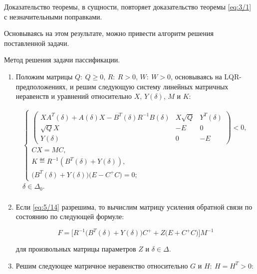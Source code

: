 Доказательство теоремы, в сущности, повторяет доказательство теоремы \vref{eq:3/1} с незначительными поправками.\br

Основываясь на этом результате, можно привести алгоритм решения поставленной задачи.

\pagebreak
\begin{alg}
\label{alg:5/1}
Метод решения задачи пассификации.

\begin{enumerate}
\item Положим матрицы $Q\colon~Q \geqslant 0$, $R\colon~R>0$, $W\colon~W>0$, основываясь на LQR-предположениях, и решим следующую систему линейных матричных неравенств и уравнений относительно $X$, $Y(\delta)$, $M$ и $K$:

\begin{eqnarray}
\label{eq:5/14}
\left\{ \begin{array}{l}
    \left( \begin{array}{ccc}
        XA^T(\delta) + A(\delta)X - B^T(\delta)R^{-1}B(\delta)   &   X\sqrt{Q}   &   Y^T(\delta) \\
        \sqrt{Q}X    &    -E    &    0 \\
        Y(\delta)    &    0     &   -E
    \end{array} \right) < 0\mbox{,} \\
    CX = MC\mbox{,} \\
    K \eqdef R^{-1}(B^T(\delta) + Y(\delta))\mbox{,} \nonumber \\
    \big( B^T(\delta) + Y(\delta) \big)\big( E - C^+C \big) = 0\mbox{;}
\end{array} \right. \\
\delta \in \Delta_0\mbox{.} \nonumber \\
\end{eqnarray}

\item Если \vref{eq:5/14} разрешима, то вычислим матрицу усиления обратной связи по состоянию по следующей формуле:

\begin{equation}
\label{eq:5/15}
F = \big[ R^{-1}\big( B^T(\delta) + Y(\delta) \big)C^+ + Z\big(E + C^+C  \big) \big]M^{-1}
\end{equation}

для произвольных матрицы параметров $Z$ и $\delta \in \Delta$.

\item Решим следующее матричное неравенство относительно $G$ и $H\colon~H=H^T>0$:


\end{enumerate}
\end{alg}
